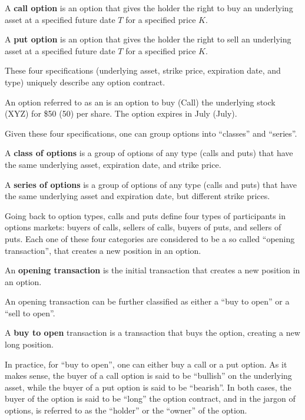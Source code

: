 A \textbf{call option} is an option that gives the holder the right to buy an underlying asset at a specified future
date $T$ for a specified price $K$.
\ed

A \textbf{put option} is an option that gives the holder the right to sell an underlying asset at a specified future
date $T$ for a specified price $K$.
\ed

These four specifications (underlying asset, strike price, expiration date, and type) uniquely describe any option
contract.

\be
An option referred to as an  is an option to buy (Call) the underlying stock (XYZ) for \$50
(50) per share. The option expires in July (July).
\ee

Given these four specifications, one can group options into ``classes'' and ``series''.

A \textbf{class of options} is a group of options of any type (calls and puts) that have the same underlying asset,
expiration date, and strike price.
\ed

A \textbf{series of options} is a group of options of any type (calls and puts) that have the same underlying asset and
expiration date, but different strike prices.
\ed

Going back to option types, calls and puts define four types of participants in options markets: buyers of calls,
sellers of calls, buyers of puts, and sellers of puts. Each one of these four categories are considered to be a so
called ``opening transaction'', that creates a new position in an option.

An \textbf{opening transaction} is the initial transaction that creates a new position in an option.
\ed

An opening transaction can be further classified as either a ``buy to open'' or a ``sell to open''.

A \textbf{buy to open} transaction is a transaction that buys the option, creating a new long position.
\ed

In practice, for ``buy to open'', one can either buy a call or a put option. As it makes sense, the buyer of a call
option is said to be ``bullish'' on the underlying asset, while the buyer of a put option is said to be ``bearish''. In
both cases, the buyer of the option is said to be ``long'' the option contract, and in the jargon of options, is
referred to as the ``holder'' or the ``owner'' of the option.

